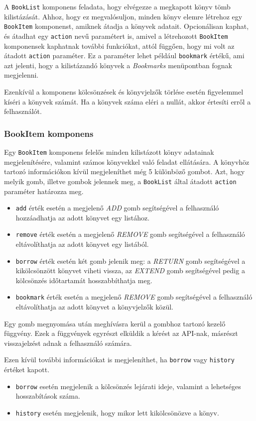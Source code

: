 A \texttt{BookList} komponens feladata, hogy elvégezze a megkapott könyv tömb kilistázását. Ahhoz, hogy ez megvalósuljon, minden könyv elemre létrehoz egy \texttt{BookItem} komponenst, amiknek átadja a könyvek adatait. Opcionálisan kaphat, és átadhat egy \texttt{action} nevű paramétert is, amivel a létrehozott \texttt{BookItem} komponensek kaphatnak további funkciókat, attól függően, hogy mi volt az átadott \texttt{action} paraméter. Ez a paraméter lehet például \texttt{bookmark} értékű, ami azt jelenti, hogy a kilistázandó könyvek a \textit{Bookmarks} menüpontban fognak megjelenni.

Ezenkívül a komponens kölcsönzések és könyvjelzők törlése esetén figyelemmel kíséri a könyvek számát. Ha a könyvek száma eléri a nullát, akkor értesíti erről a felhasználót.

\subsubsection{BookItem komponens}

Egy \texttt{BookItem} komponens felelős minden kilistázott könyv adatainak megjelenítésére, valamint számos könyvekkel való feladat ellátására. A könyvhöz tartozó információkon kívül megjeleníthet még 5 különböző gombot. Azt, hogy melyik gomb, illetve gombok jelennek meg, a \texttt{BookList} által átadott \texttt{action} paraméter határozza meg.
\begin{itemize}
    \item \texttt{add} érték esetén a megjelenő \textit{ADD} gomb segítségével a felhasználó hozzáadhatja az adott könyvet egy listához.
    \item \texttt{remove} érték esetén a megjelenő \textit{REMOVE} gomb segítségével a felhasználó eltávolíthatja az adott könyvet egy listából.
    \item \texttt{borrow} érték esetén két gomb jelenik meg: a \textit{RETURN} gomb segítségével a kikölcsönzött könyvet viheti vissza, az \textit{EXTEND} gomb segítségével pedig a kölcsönzés időtartamát hosszabbíthatja meg.
    \item \texttt{bookmark} érték esetén a megjelenő \textit{REMOVE} gomb segítségével a felhasználó eltávolíthatja az adott könyvet a könyvjelzők közül.
\end{itemize}
Egy gomb megnyomása után meghívásra kerül a gombhoz tartozó kezelő függvény. Ezek a függvények egyrészt elküldik a kérést az API-nak, másrészt visszajelzést adnak a felhasználó számára.

Ezen kívül további információkat is megjeleníthet, ha \texttt{borrow} vagy \texttt{history} értéket kapott.
\begin{itemize}
    \item \texttt{borrow} esetén megjelenik a kölcsönzés lejárati ideje, valamint a lehetséges hosszabítások száma.
    \item \texttt{history} esetén megjelenik, hogy mikor lett kikölcsönözve a könyv.
\end{itemize}

